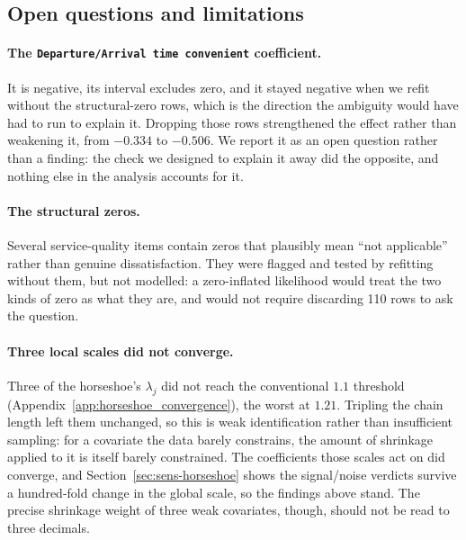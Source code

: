 \subsection{Open questions and limitations}

\paragraph{The \texttt{Departure/Arrival time convenient} coefficient.}
It is negative, its interval excludes zero, and it stayed negative when we
refit without the structural-zero rows, which is the direction the ambiguity
would have had to run to explain it. Dropping those rows strengthened the
effect rather than weakening it, from $-0.334$ to $-0.506$. We report it as an
open question rather than a finding: the check we designed to explain it away
did the opposite, and nothing else in the analysis accounts for it.

\paragraph{The structural zeros.} Several service-quality items contain zeros
that plausibly mean ``not applicable'' rather than genuine dissatisfaction.
They were flagged and tested by refitting without them, but not modelled: a
zero-inflated likelihood would treat the two kinds of zero as what they are,
and would not require discarding \num{110} rows to ask the question.

\paragraph{Three local scales did not converge.} Three of the horseshoe's
$\lambda_j$ did not reach the conventional $1.1$ threshold
(Appendix~\ref{app:horseshoe_convergence}), the worst at $1.21$. Tripling the
chain length left them unchanged, so this is weak identification rather than
insufficient sampling: for a covariate the data barely constrains, the amount
of shrinkage applied to it is itself barely constrained. The coefficients those
scales act on did converge, and Section~\ref{sec:sens-horseshoe} shows the
signal/noise verdicts survive a hundred-fold change in the global scale, so the
findings above stand. The precise shrinkage weight of three weak covariates,
though, should not be read to three decimals.
